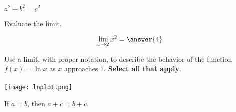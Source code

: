 \documentclass{ximera}
\begin{document}
\begin{definition}
    $a^2+b^2 = c^2$
\end{definition}    


\begin{exercise}
Evaluate the limit.

\[ \lim\limits_{x \to 2} x^2 = \answer{4} \]

\end{exercise}



\begin{question} Use a limit, with proper notation, to describe the behavior of the function $f(x)=\ln x$ as $x$ approaches $1.$  \textbf{Select all that apply}. \\ \\

    \texttt{[image: lnplot.png]}


\begin{selectAll}
    \end{selectAll}
    \end{question}

\begin{theorem}
If \( a = b \), then \( a + c = b + c \).
\end{theorem}
\end{document}
